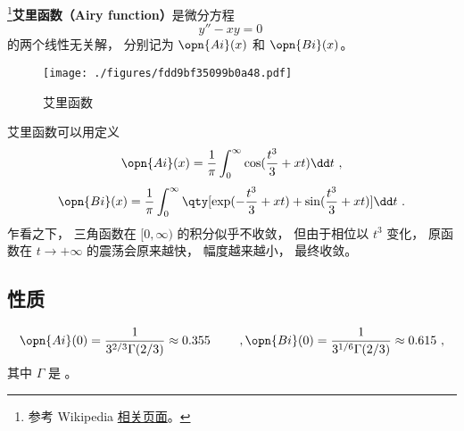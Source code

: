 
\begin{issues}
\issueTODO
\end{issues}


\footnote{参考 Wikipedia \href{https://en.wikipedia.org/wiki/Airy_function}{相关页面}。}\textbf{艾里函数（Airy function）}是微分方程
\begin{equation}\label{eq_AiryF_2}
y'' - xy = 0~
\end{equation}
的两个线性无关解， 分别记为 $\opn{Ai}(x)$ 和 $\opn{Bi}(x)$。

\begin{figure}[ht]
\centering
\texttt{[image: ./figures/fdd9bf35099b0a48.pdf]}
\caption{艾里函数} \label{fig_AiryF_1}
\end{figure}

艾里函数可以用定义 %
\begin{equation}
\opn{Ai}(x)=\frac 1\pi \int_0^\infty \cos(\frac{t^3}{3}+xt)\dd t~,
\end{equation}
\begin{equation}
\opn{Bi}(x)=\frac 1\pi \int_0^\infty \qty[\exp(-\frac{t^3}{3}+xt)+\sin(\frac{t^3}{3}+xt)]\dd t~.
\end{equation}
乍看之下， 三角函数在 $[0,\infty)$ 的积分似乎不收敛， 但由于相位以 $t^3$ 变化， 原函数在 $t\to+\infty$ 的震荡会原来越快， 幅度越来越小， 最终收敛。


\subsection{性质}
\begin{equation}
\opn{Ai}(0) = \frac{1}{3^{2/3} \Gamma(2/3)} \approx 0.355
\qquad~,
\opn{Bi}(0) = \frac{1}{3^{1/6} \Gamma(2/3)} \approx 0.615~,
\end{equation}
其中 $\Gamma$ 是 。

